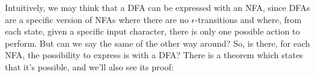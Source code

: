 \begin{example}
    \begin{center}
    \end{center}
\end{example}

Intuitively, we may think that a DFA can be expressed with an NFA, since DFAs are a specific version of NFAs where there are no $\epsilon$-transitions and where, from each state, given a specific input character, there is only one possible action to perform. But can we say the same of the other way around? So, is there, for each NFA, the possibility to express is with a DFA? There is a theorem which states that it's possible, and we'll also see its proof:
\pagebreak %

